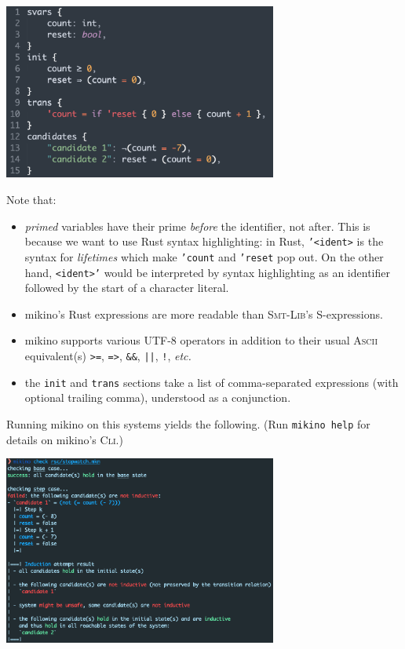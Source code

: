 \documentclass{easychair}
\newcommand{\mkn}{mikino}
\newcommand{\smt}{\textsc{Smt}}
\newcommand{\smtlib}{\smt{}-\textsc{Lib}}
\newcommand{\ita}[1]{\textit{#1}}
\newcommand{\code}[1]{\textcolor{orange!75!black}{\texttt{#1}}}
\newcommand{\picwidth}{9cm}
\newcommand{\init}{\code{init}}
\newcommand{\trans}{\code{trans}}
\begin{document}
\begin{center}
    \includegraphics[width=\picwidth]{../rsc/stopwatch_1.png}
\end{center}
%
Note that:
%
\begin{itemize}
    \item \ita{primed} variables have their prime \ita{before} the identifier, not after. This is
        because we want to use Rust syntax highlighting: in Rust, \code{'<ident>} is the syntax for
        \ita{lifetimes} which make \code{'count} and \code{'reset} pop out. On the other hand,
        \code{<ident>'} would be interpreted by syntax highlighting as an identifier followed by
        the start of a character literal.
    \item \mkn{}'s Rust expressions are more readable than \smtlib{}'s S-expressions.
    \item \mkn{} supports various \textsc{UTF}-8 operators in addition to their usual \textsc{Ascii}
        equivalent(s) \code{>=}, \code{=>}, \code{\&\&}, \code{||}, \code{!}, \ita{etc.}
    \item the \init{} and \trans{} sections take a list of comma-separated expressions (with
        optional trailing comma), understood as a conjunction.
\end{itemize}

Running \mkn{} on this systems yields the following. (Run \code{mikino help} for details on
\mkn{}'s \textsc{Cli}.)
%
\begin{center}
    \includegraphics[width=\picwidth]{../rsc/stopwatch_run_1.png}
\end{center}
%
\end{document}
